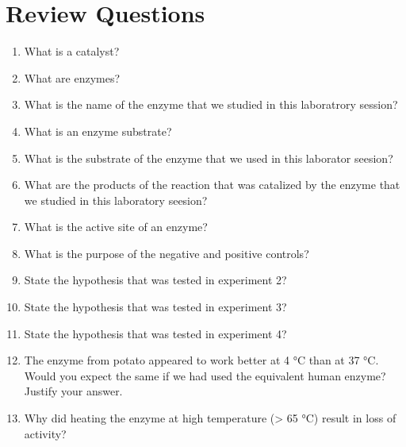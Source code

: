 \section{Review Questions}\label{review-questions-4}

\begin{enumerate}
\def\labelenumi{\arabic{enumi}.}
\tightlist
\item
  What is a catalyst?
\item
  What are enzymes?
\item
  What is the name of the enzyme that we studied in this laboratrory
  session?
\item
  What is an enzyme substrate?
\item
  What is the substrate of the enzyme that we used in this laborator
  seesion?
\item
  What are the products of the reaction that was catalized by the enzyme
  that we studied in this laboratory seesion?
\item
  What is the active site of an enzyme?
\item
  What is the purpose of the negative and positive controls?
\item
  State the hypothesis that was tested in experiment 2?
\item
  State the hypothesis that was tested in experiment 3?
\item
  State the hypothesis that was tested in experiment 4?
\item
  The enzyme from potato appeared to work better at 4 °C than at 37 °C.
  Would you expect the same if we had used the equivalent human enzyme?
  Justify your answer.
\item
  Why did heating the enzyme at high temperature (\textgreater{} 65 °C)
  result in loss of activity?
\end{enumerate}


